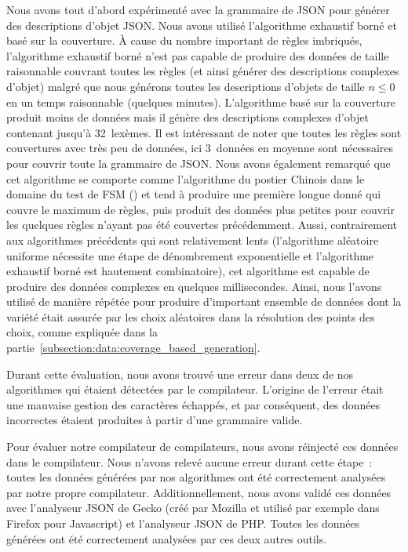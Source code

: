 Nous avons tout d'abord expérimenté avec la grammaire de JSON pour générer des
descriptions d'objet JSON. Nous avons
utilisé l'algorithme exhaustif borné et basé sur la couverture. À cause du
nombre important de règles imbriqués, l'algorithme exhaustif borné n'est pas
capable de produire des données de taille raisonnable couvrant toutes les règles
(et ainsi générer des descriptions complexes d'objet) malgré que nous générons
toutes les descriptions d'objets de taille $n \leq 0$ en un temps raisonnable
(quelques minutes). L'algorithme basé sur la couverture produit moins de données
mais il génère des descriptions complexes d'objet contenant jusqu'à 32~lexèmes.
Il est intéressant de noter que toutes les règles sont couvertures avec très peu
de données, ici 3~données en moyenne sont nécessaires pour couvrir toute la
grammaire de JSON. Nous avons également remarqué que cet algorithme se comporte
comme l'algorithme du postier Chinois dans le domaine du test de FSM
() et tend à produire une première longue donné
qui couvre le maximum de règles, puis produit des données plus petites pour
couvrir les quelques règles n'ayant pas été couvertes précédemment. Aussi,
contrairement aux algorithmes précédents qui sont relativement lents
(l'algorithme aléatoire uniforme nécessite une étape de dénombrement
exponentielle et l'algorithme exhaustif borné est hautement combinatoire), cet
algorithme est capable de produire des données complexes en quelques
millisecondes. Ainsi, nous l'avons utilisé de manière répétée pour produire
d'important ensemble de données dont la variété était assurée par les choix
aléatoires dans la résolution des points des choix, comme expliquée dans la
partie~\ref{subsection:data:coverage_based_generation}.

Durant cette évaluation, nous avons trouvé une erreur dans deux de nos
algorithmes qui étaient détectées par le compilateur. L'origine de l'erreur
était une mauvaise gestion des caractères échappés, et par conséquent, des
données incorrectes étaient produites à partir d'une grammaire valide.

Pour évaluer notre compilateur de compilateurs, nous avons réinjecté ces données
dans le compilateur. Nous n'avons relevé aucune erreur durant cette étape~:
toutes les données générées par nos algorithmes ont été correctement analysées
par notre propre compilateur. Additionnellement, nous avons validé ces données
avec l'analyseur JSON de Gecko (créé par Mozilla et utilisé par exemple dans
Firefox pour Javascript) et l'analyseur JSON de PHP. Toutes les données générées
ont été correctement analysées par ces deux autres outils.

